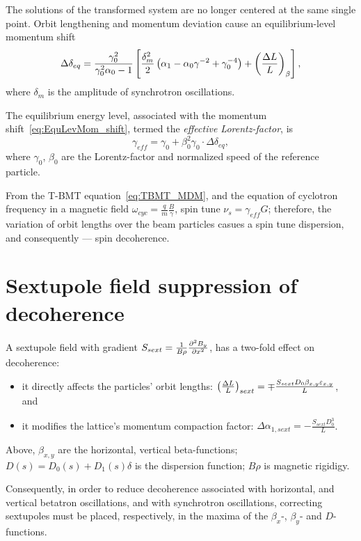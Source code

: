 \documentclass[a4paper]{jacow}
\newcommand{\w}{\omega}
\begin{document}
The solutions of the transformed system are no longer centered at the same single point. Orbit lengthening and momentum deviation cause an equilibrium-level momentum shift~\cite[p.~2581]{Senichev:IPAC13}
\begin{equation}\label{eq:EquLevMom_shift}
\Delta\delta_{eq} = \frac{\gamma_0^2}{\gamma_0^2\alpha_0 - 1}\bkt*{\frac{\delta_m^2}{2}\bkt{\alpha_1 - \alpha_0\gamma^{-2} + \gamma_0^{-4}} + \bkt{\frac{\Delta L}{L}}_\beta},
\end{equation}
where $\delta_m$ is the amplitude of synchrotron oscillations.

The equilibrium energy level, associated with the momentum shift~\eqref{eq:EquLevMom_shift}, termed the \emph{effective Lorentz-factor}, is\cite{Senichev:FDM}
\begin{equation}\label{eq:EffectiveGamma}
\gamma_{eff} = \gamma_0 + \beta_0^2\gamma_0\cdot\Delta\delta_{eq},
\end{equation}
where $\gamma_0$, $\beta_0$ are the Lorentz-factor and normalized speed of the reference particle.

From the T-BMT equation~\eqref{eq:TBMT_MDM}, and the equation of cyclotron frequency in a magnetic field $\w_{cyc} = \frac qm \frac B\gamma$, spin tune $\nu_s = \gamma_{eff}G$; therefore, the variation of orbit lengths over the beam particles casues a spin tune dispersion, and consequently --- spin decoherence.

\section{Sextupole field suppression of decoherence}
A sextupole field with gradient $ S_{sext} = \frac{1}{B\rho} \pddx{B_y}[x][2]$, has a two-fold effect on decoherence:
\begin{itemize}
\item it directly affects the particles' orbit lengths: $\bkt{\frac{\Delta L}{L}}_{sext} = \mp \frac{S_{sext}D_0\beta_{x,y}\varepsilon_{x,y}}{L}$, and
\item it modifies the lattice's momentum compaction factor: $\Delta \alpha_{1,sext} = -\frac{S_{sext}D_0^3}{L}$.
\end{itemize}
Above, $\beta_{x,y}$ are the horizontal, vertical beta-functions; $D(s) = D_0(s) + D_1(s)\delta$ is the dispersion function; $B\rho$ is magnetic rigidigy.

Consequently, in order to reduce decoherence associated with horizontal, and vertical betatron oscillations, and with synchrotron oscillations, correcting sextupoles must be placed, respectively, in the maxima of the $\beta_x$-, $\beta_y$- and $D$-functions.
\end{document}
